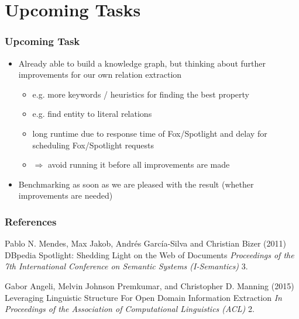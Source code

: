 \documentclass{beamer}
\begin{document}

\section{Upcoming Tasks}

\begin{frame}
\frametitle{Upcoming Task}
\begin{itemize}
	\item Already able to build a knowledge graph, but thinking about further improvements for our own relation extraction
	\begin{itemize}
		\item e.g. more keywords / heuristics for finding the best property
		\item e.g. find entity to literal relations 
		\item long runtime due to response time of Fox/Spotlight and delay for scheduling Fox/Spotlight requests
		\item[] $\Rightarrow$ avoid running it before all improvements are made
	\end{itemize}
	\item Benchmarking as soon as we are pleased with the result (whether improvements are needed)
\end{itemize}
\end{frame}


\begin{frame}
\frametitle{References}
\footnotesize{
	\begin{thebibliography}{99} %
		 Pablo N. Mendes, Max Jakob, Andrés García-Silva and Christian Bizer (2011)
		\newblock DBpedia Spotlight: Shedding Light on the Web of
		Documents
		\newblock \emph{
			Proceedings of the 7th International Conference on Semantic Systems (I-Semantics) } 3.
	\end{thebibliography}
	\begin{thebibliography}{99} %
		 Gabor Angeli, Melvin Johnson Premkumar, and Christopher D. Manning (2015)
		\newblock Leveraging Linguistic Structure For Open Domain Information
		Extraction
		\newblock \emph{
			In Proceedings of the Association of Computational Linguistics (ACL) } 2.
	\end{thebibliography}
}
\end{frame}

\end{document}
